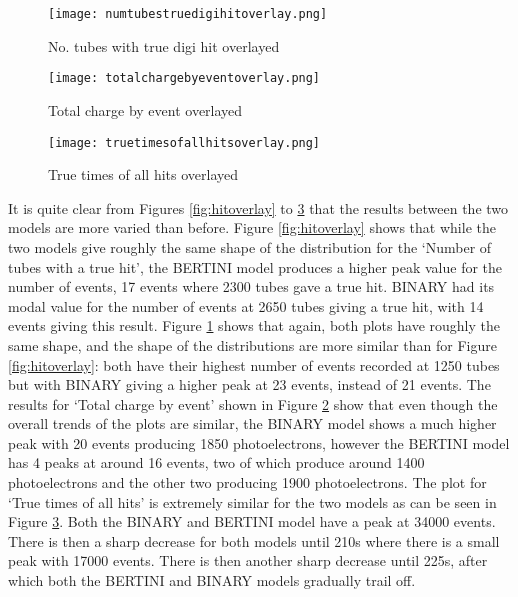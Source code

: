 \documentclass[11pt,oneside,a4paper]{article}
\begin{document}
\begin{figure}
		\centering
		\captionsetup{justification=centering}
		\texttt{[image: numtubestruedigihitoverlay.png]}
		\caption{No. tubes with true digi hit overlayed}
		\label{fig:digihitoverlay}
	\end{figure}
	
	\begin{figure}
		\centering
		\captionsetup{justification=centering}
		\texttt{[image: totalchargebyeventoverlay.png]}
		\caption{Total charge by event overlayed}
		\label{fig:qoverlay}
	\end{figure}

	\begin{figure}
		\centering
		\captionsetup{justification=centering}
		\texttt{[image: truetimesofallhitsoverlay.png]}
		\caption{True times of all hits overlayed}
		\label{fig:timeoverlay}
	\end{figure}

It is quite clear from Figures \ref{fig:hitoverlay} to \ref{fig:timeoverlay} that the results between the two models are more varied than before. Figure \ref{fig:hitoverlay} shows that while the two models give roughly the same shape of the distribution for the `Number of tubes with a true hit', the BERTINI model produces a higher peak value for the number of events, 17 events where 2300 tubes gave a true hit. BINARY had its modal value for the number of events at 2650 tubes giving a true hit, with 14 events giving this result. Figure \ref{fig:digihitoverlay} shows that again, both plots have roughly the same shape, and the shape of the distributions are more similar than for Figure \ref{fig:hitoverlay}: both have their highest number of events recorded at 1250 tubes but with BINARY giving a higher peak at 23 events, instead of 21 events. The results for `Total charge by event' shown in Figure \ref{fig:qoverlay} show that even though the overall trends of the plots are similar, the BINARY model shows a much higher peak with 20 events producing 1850 photoelectrons, however the BERTINI model has 4 peaks at around 16 events, two of which produce around 1400 photoelectrons and the other two producing 1900 photoelectrons. The plot for `True times of all hits' is extremely similar for the two models as can be seen in Figure \ref{fig:timeoverlay}. Both the BINARY and BERTINI model have a peak at 34000 events. There is then a sharp decrease for both models until 210s where there is a small peak with 17000 events. There is then another sharp decrease until 225s, after which both the BERTINI and BINARY models gradually trail off.
\end{document}
